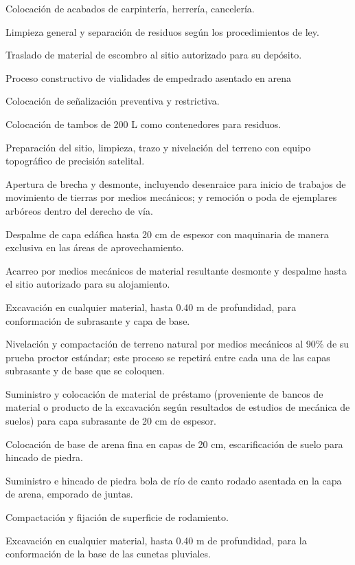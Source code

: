 \documentclass{article}
\begin{document}
Colocación de acabados de carpintería, herrería, cancelería.

Limpieza general y separación de residuos según los procedimientos de ley.

Traslado de material de escombro al sitio autorizado para su depósito.


\bigskip


\bigskip

Proceso constructivo de vialidades de empedrado asentado en arena


\bigskip

Colocación de señalización preventiva y restrictiva.

Colocación de tambos de 200 L como contenedores para residuos.

Preparación del sitio, limpieza, trazo y nivelación del terreno con equipo topográfico de precisión satelital.

Apertura de brecha y desmonte, incluyendo desenraice para inicio de trabajos de movimiento de tierras por medios mecánicos; y remoción o poda de ejemplares arbóreos dentro del derecho de vía.

Despalme de capa edáfica hasta 20 cm de espesor con maquinaria de manera exclusiva en las áreas de aprovechamiento.

Acarreo por medios mecánicos de material resultante desmonte y despalme hasta el sitio autorizado para su alojamiento.

Excavación en cualquier material, hasta 0.40 m de profundidad, para conformación de subrasante y capa de base.

Nivelación y compactación de terreno natural por medios mecánicos al 90\% de su prueba proctor estándar; este proceso se repetirá entre cada una de las capas subrasante y de base que se coloquen.

Suministro y colocación de material de préstamo (proveniente de bancos de material o producto de la excavación según resultados de estudios de mecánica de suelos) para capa subrasante de 20 cm de espesor.

Colocación de base de arena fina en capas de 20 cm, escarificación de suelo para hincado de piedra.

Suministro e hincado de piedra bola de río de canto rodado asentada en la capa de arena, emporado de juntas.

Compactación y fijación de superficie de rodamiento.

Excavación en cualquier material, hasta 0.40 m de profundidad, para la conformación de la base de las cunetas pluviales.
\end{document}
